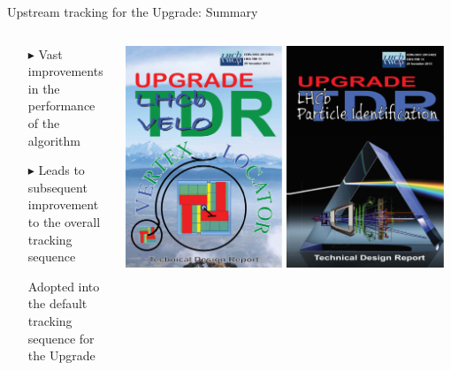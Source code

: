 \documentclass[aspectratio=1610]{beamer}
\begin{document}
\begin{frame}{Upstream tracking for the Upgrade: Summary}

\begin{columns}
\begin{column}{0.75\textwidth}
\begin{itemize}
  \item[$\blacktriangleright$] Vast improvements in the performance of the \velout algorithm
  \item[$\blacktriangleright$] Leads to subsequent improvement to the overall tracking sequence
  \item[\ding{80}] Adopted into the default tracking sequence for the \lhcb Upgrade
\end{itemize}
\end{column}
\begin{column}{0.25\textwidth}
\href{https://cds.cern.ch/record/1624070}{\includegraphics[width=0.48\textwidth]{figs/VELO.pdf}}
\href{https://cds.cern.ch/record/1624074}{\includegraphics[width=0.48\textwidth]{figs/PID.pdf}}\\

\end{column}
\end{columns}
\end{frame}
\end{document}
